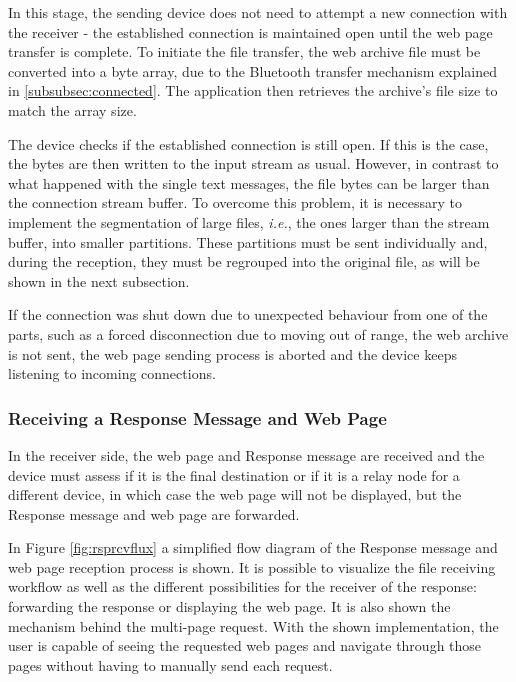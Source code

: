 In this stage, the sending device does not need to attempt a new connection with the receiver - the established connection is maintained open until the web page transfer is complete. To initiate the file transfer, the web archive file must be converted into a byte array, due to the Bluetooth transfer mechanism explained in \ref{subsubsec:connected}. The application then retrieves the archive's file size to match the array size.

The device checks if the established connection is still open. If this is the case, the bytes are then written to the input stream as usual. However, in contrast to what happened with the single text messages, the file bytes can be larger than the connection stream buffer. To overcome this problem, it is necessary to implement the segmentation of large files, \textit{i.e.}, the ones larger than the stream buffer, into smaller partitions. These partitions must be sent individually and, during the reception, they must be regrouped into the original file, as will be shown in the next subsection.

If the connection was shut down due to unexpected behaviour from one of the parts, such as a forced disconnection due to moving out of range, the web archive is not sent, the web page sending process is aborted and the device keeps listening to incoming connections.

\subsubsection{Receiving a Response Message and Web Page}
\label{subsubsec:rcvrsp}

In the receiver side, the web page and Response message are received and the device must assess if it is the final destination or if it is a relay node for a different device, in which case the web page will not be displayed, but the Response message and web page are forwarded.

In Figure \ref{fig:rsprcvflux} a simplified flow diagram of the Response message and web page reception process is shown. It is possible to visualize the file receiving workflow as well as the different possibilities for the receiver of the response: forwarding the response or displaying the web page. It is also shown the mechanism behind the multi-page request. With the shown implementation, the user is capable of seeing the requested web pages and navigate through those pages without having to manually send each request.

